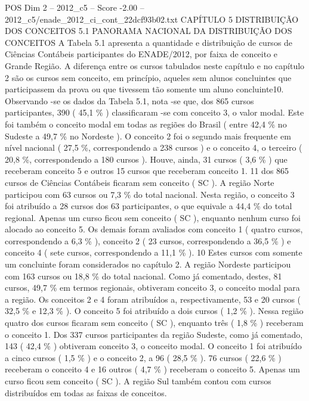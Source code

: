 \begin{textsample}{POS Dim 2 – 2012\_c5 – Score -2.00 – 2012\_c5/enade\_2012\_ci\_cont\_22dcf93b02.txt}  \label{ex:f2_pos_363}
CAPÍTULO 5 DISTRIBUIÇÃO DOS CONCEITOS 5.1 PANORAMA NACIONAL DA DISTRIBUIÇÃO DOS CONCEITOS A Tabela 5.1 apresenta a quantidade e distribuição de cursos de Ciências Contábeis participantes do ENADE/2012, por faixa de conceito e Grande Região.
A diferença entre os cursos tabulados neste capítulo e no capítulo 2 são os cursos sem conceito, em princípio, aqueles sem alunos concluintes que participassem da prova ou que tivessem tão somente um aluno concluinte10.
Observando -se os dados da Tabela 5.1, nota -se que, dos 865 cursos participantes, 390 ( 45,1 \% ) classificaram -se com conceito 3, o valor modal.
Este foi também o conceito modal em todas as regiões do Brasil ( entre 42,4 \% no Sudeste a 49,7 \% no Nordeste ).
O conceito 2 foi o segundo mais frequente em nível nacional ( 27,5 \%, correspondendo a 238 cursos ) e o conceito 4, o terceiro ( 20,8 \%, correspondendo a 180 cursos ).
Houve, ainda, 31 cursos ( 3,6 \% ) que receberam conceito 5 e outros 15 cursos que receberam conceito 1. 11 dos 865 cursos de Ciências Contábeis ficaram sem conceito ( SC ).
A região Norte participou com 63 cursos ou 7,3 \% do total nacional.
Nesta região, o conceito 3 foi atribuído a 28 cursos dos 63 participantes, o que equivale a 44,4 \% do total regional.
Apenas um curso ficou sem conceito ( SC ), enquanto nenhum curso foi alocado ao conceito 5.
Os demais foram avaliados com conceito 1 ( quatro cursos, correspondendo a 6,3 \% ), conceito 2 ( 23 cursos, correspondendo a 36,5 \% ) e conceito 4 ( sete cursos, correspondendo a 11,1 \% ). 10 Estes cursos com somente um concluinte foram considerados no capítulo 2.
A região Nordeste participou com 163 cursos ou 18,8 \% do total nacional.
Como já comentado, destes, 81 cursos, 49,7 \% em termos regionais, obtiveram conceito 3, o conceito modal para a região.
Os conceitos 2 e 4 foram atribuídos a, respectivamente, 53 e 20 cursos ( 32,5 \% e 12,3 \% ).
O conceito 5 foi atribuído a dois cursos ( 1,2 \% ).
Nessa região quatro dos cursos ficaram sem conceito ( SC ), enquanto três ( 1,8 \% ) receberam o conceito 1.
Dos 337 cursos participantes da região Sudeste, como já comentado, 143 ( 42,4 \% ) obtiveram conceito 3, o conceito modal.
O conceito 1 foi atribuído a cinco cursos ( 1,5 \% ) e o conceito 2, a 96 ( 28,5 \% ). 76 cursos ( 22,6 \% ) receberam o conceito 4 e 16 outros ( 4,7 \% ) receberam o conceito 5.
Apenas um curso ficou sem conceito ( SC ).
A região Sul também contou com cursos distribuídos em todas as faixas de conceitos.

\end{textsample}
